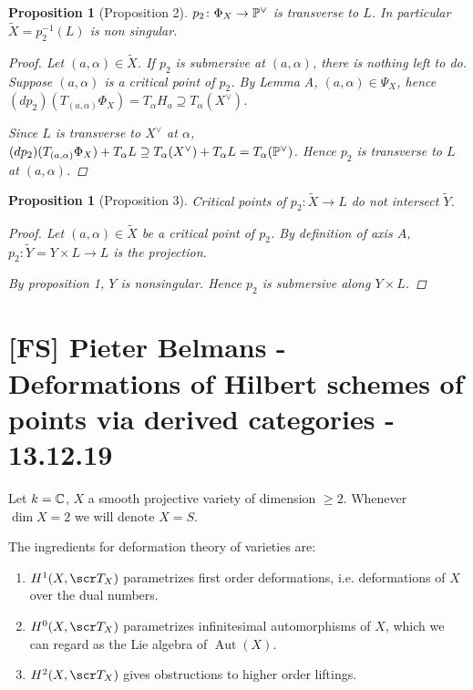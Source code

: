 \documentclass[A4paper, british, reqno]{amsart}
\theoremstyle{darkgreentheorem}
\newtheorem{prop}[thm]{Proposition}
\theoremstyle{darkbluedefinition}
\theoremstyle{darkredexample}
\theoremstyle{remark}
\DeclareMathOperator{\Aut}{Aut}
\newcommand{\1}{\mathbbm{1}}
\newcommand{\dual}{^{\vee}}
\begin{document}
\begin{prop}[Proposition 2]
    $p_{2}\colon \Phi_{X}\to \P\dual$ is transverse to $L$.
    In particular $\tilde{X}=p_{2}^{-1}(L)$ is non singular.
    \begin{proof}
	Let $(a,\alpha)\in \tilde{X}$.
	If $p_{2}$ is submersive at $(a,\alpha)$, there is nothing left to do.
	Suppose $(a,\alpha)$ is a critical point of $p_{2}$.
	By Lemma A, $(a,\alpha)\in \Psi_{X}$, hence $(dp_{2})(T_{(a,\alpha)}\Phi_{X})=T_{\alpha}H_{a}\supseteq T_{\alpha}(X\dual)$.

	Since $L$ is transverse to $X\dual$ at $\alpha$, $(dp_{2})(T_{(a,\alpha)}\Phi_{X})+T_{\alpha}L\supseteq T_{\alpha}(X\dual)+T_{\alpha}L=T_{\alpha}(\P\dual)$.
	Hence $p_{2}$ is transverse to $L$ at $(a,\alpha)$.
    \end{proof}
\end{prop}

\begin{prop}[Proposition 3]
    Critical points of $p_{2}\colon \tilde{X}\to L$ do not intersect $\tilde{Y}$.
    \begin{proof}
	Let $(a,\alpha)\in \tilde{X}$ be a critical point of $p_{2}$.
	By definition of axis $A$, $p_{2}\colon \tilde{Y}=Y\times L\to L$ is the projection.

	By proposition 1, $Y$ is nonsingular.
	Hence $p_{2}$ is submersive along $Y\times L$.
    \end{proof}
\end{prop}

\section{[FS] Pieter Belmans - Deformations of Hilbert schemes of points via derived categories - 13.12.19}

Let $k=\mathbb{C}$, $X$ a smooth projective variety of dimension $\geqslant 2$.
Whenever $\dim{X}=2$ we will denote $X=S$.

The ingredients for deformation theory of varieties are:
\begin{enumerate}
    \item $H^{1}(X,\sT_{X})$ parametrizes first order deformations, i.e. deformations of $X$ over the dual numbers.
    \item $H^{0}(X,\sT_{X})$ parametrizes infinitesimal automorphisms of $X$, which we can regard as the Lie algebra of $\Aut(X)$.
    \item $H^{2}(X,\sT_{X})$ gives obstructions to higher order liftings.
\end{enumerate}
\end{document}

